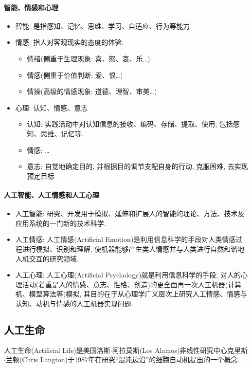\paragraph{\textbf{智能、情感和心理}}
\begin{itemize}
\item 智能: 是指感知、记忆、思维、学习、自适应、行为等能力
\item 情感: 指人对客观现实的态度的体验.
           \begin{itemize}
               \item 情绪(侧重于生理现象: 喜、怒、哀、乐…)
               \item 情感(侧重于价值判断: 爱、恨…)
               \item 情操(高级的情感现象: 道德、理智、审美…)
           \end{itemize}
\item 心理: 认知、情感、意志
           \begin{itemize}
               \item 认知: 实践活动中对认知信息的接收、编码、存储、提取、使用; 包括感知、思维、记忆等.
               \item 情感: …
               \item 意志: 自觉地确定目的, 并根据目的调节支配自身的行动, 克服困难, 去实现预定目标
           \end{itemize}
\end{itemize}
\paragraph{\textbf{人工智能、人工情感和人工心理}}
\begin{itemize}
\item 人工智能: 研究、开发用于模拟、延伸和扩展人的智能的理论、方法、技术及应用系统的一门新的技术科学.
\item 人工情感: 人工情感(Artificial Emotion)是利用信息科学的手段对人类情感过程进行模拟、识别和理解, 使机器能够产生类人情感并与人类进行自然和谐地人机交互的研究领域.
\item 人工心理: 人工心理(Artificial Psychology)就是利用信息科学的手段,  对人的心理活动(着重是人的情感、意志、性格、创造)的更全面再一次人工机器(计算机、模型算法等)模拟, 其目的在于从心理学广义层次上研究人工情感、情感与认知、动机与情感的人工机器实现问题.
\end{itemize}
\subsection{人工生命 }
人工生命(Artificial Life)是美国洛斯$\cdot$阿拉莫斯(Los Alamos)非线性研究中心克里斯$\cdot$兰顿(Chris Langton)于1987年在研究“混沌边沿”的细胞自动机提出的一个概念.


